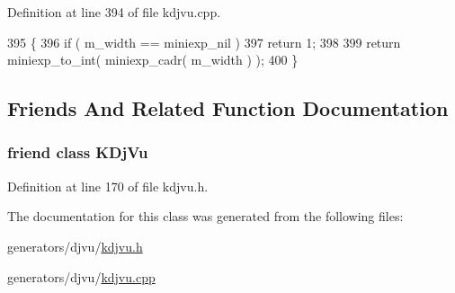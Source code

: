 Definition at line 394 of file kdjvu.\+cpp.


\begin{DoxyCode}
395 \{
396     \textcolor{keywordflow}{if} ( m\_width == miniexp\_nil )
397         \textcolor{keywordflow}{return} 1;
398 
399     \textcolor{keywordflow}{return} miniexp\_to\_int( miniexp\_cadr( m\_width ) );
400 \}
\end{DoxyCode}


\subsection{Friends And Related Function Documentation}
\hypertarget{classKDjVu_1_1LineAnnotation_a4241ce0336d22245ffdb13dd5cb6edcc}{
\subsubsection[{K\+Dj\+Vu}]{\setlength{\rightskip}{0pt plus 5cm}friend class {\bf K\+Dj\+Vu}\hspace{0.3cm}{\ttfamily [friend]}}}\label{classKDjVu_1_1LineAnnotation_a4241ce0336d22245ffdb13dd5cb6edcc}


Definition at line 170 of file kdjvu.\+h.



The documentation for this class was generated from the following files\+:\begin{DoxyCompactItemize}
\item 
generators/djvu/\hyperlink{kdjvu_8h}{kdjvu.\+h}\item 
generators/djvu/\hyperlink{kdjvu_8cpp}{kdjvu.\+cpp}\end{DoxyCompactItemize}
